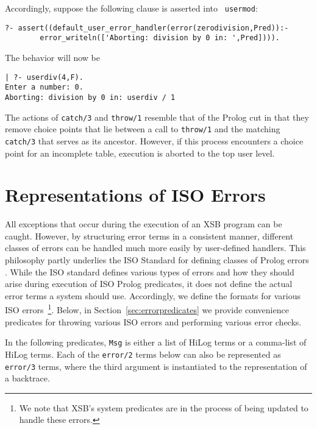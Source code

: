 Accordingly, suppose the following clause is asserted into {\tt
usermod}:
%
\begin{small}
\begin{verbatim}
?- assert((default_user_error_handler(error(zerodivision,Pred)):- 
        error_writeln(['Aborting: division by 0 in: ',Pred]))).
\end{verbatim}
\end{small}
%
The behavior will now be
\begin{small}
\begin{verbatim}
| ?- userdiv(4,F).
Enter a number: 0.
Aborting: division by 0 in: userdiv / 1
\end{verbatim}
\end{small}
The actions of {\tt catch/3} and {\tt throw/1} resemble that of the
Prolog cut in that they remove choice points that lie between a call
to {\tt throw/1} and the matching {\tt catch/3} that serves as its
ancestor.  However, if this process encounters a choice point for an
incomplete table, execution is aborted to the top user level.

\section{Representations of ISO Errors} \label{sec:iso-errors}

All exceptions that occur during the execution of an XSB program can
be caught.  However, by structuring error terms in a consistent
manner, different classes of errors can be handled much more easily by
user-defined handlers.  This philosophy partly underlies the ISO
Standard for defining classes of Prolog errors \cite{ISO-Prolog}.
While the ISO standard defines various types of errors and how they
should arise during execution of ISO Prolog predicates, it does not
define the actual error terms a system should use.  Accordingly, we
define the formats for various ISO errors~\footnote{We note that XSB's
  system predicates are in the process of being updated to handle
  these errors.}.  Below, in Section~\ref{sec:errorpredicates} we
provide convenience predicates for throwing various ISO errors and
performing various error checks.

In the following predicates, {\tt Msg} is either a list of HiLog terms
or a comma-list of HiLog terms.  Each of the {\tt error/2} terms below
can also be represented as {\tt error/3} terms, where the third
argument is instantiated to the representation of a backtrace.

